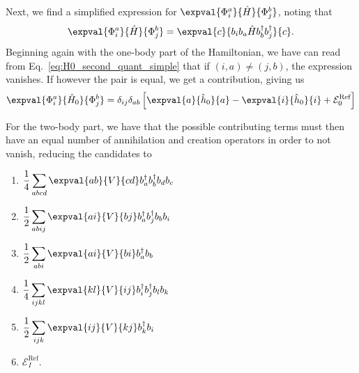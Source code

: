 Next, we find a simplified expression for $\expval{\Phi_i^a}{\hat{H}}{\Phi_j^b}$,
noting that
\begin{equation*}
    \expval{\Phi_i^a}{\hat{H}}{\Phi_j^b} = \expval{c}{b_i b_a \hat{H} b_b^\dagger b_j^\dagger}{c}.
\end{equation*}
Beginning again with the one-body part of the Hamiltonian, we have can read from Eq.~\eqref{eq:H0_second_quant_simple} that if $(i, a) \neq (j, b)$, the expression vanishes.
If however the pair is equal, we get a contribution, giving us
\begin{equation*}
    \expval{\Phi_i^a}{\hat{H}_0}{\Phi_j^b} = \delta_{ij} \delta_{ab} \left[ \expval{a}{\hat{h}_0}{a} - \expval{i}{\hat{h}_0}{i} + \mathcal{E}_0^{\text{Ref}} \right]
\end{equation*}

For the two-body part, we have that the possible contributing terms must then have an equal number of annihilation and creation operators in order to not vanish, reducing the candidates to
\begin{multicols}{2}{}
    \begin{enumerate}
        \item  $\displaystyle\frac{1}{4} \sum_{abcd} \expval{ab}{V}{cd} b_a^\dagger b_b^\dagger b_d b_c$
        \item  $\displaystyle\frac{1}{2} \sum_{abij} \expval{ai}{V}{bj} b_a^\dagger b_j^\dagger b_b b_i$
        \item  $\displaystyle\frac{1}{2} \sum_{abi} \expval{ai}{V}{bi} b_a^\dagger b_b$
        \item  $\displaystyle\frac{1}{4} \sum_{ijkl} \expval{kl}{V}{ij} b_i^\dagger b_j^\dagger b_l b_k$
        \item  $\displaystyle\frac{1}{2} \sum_{ijk} \expval{ij}{V}{kj} b_k^\dagger b_i$
        \item  $\displaystyle\mathcal{E}_I^\text{Ref}$.
    \end{enumerate}
\end{multicols}

